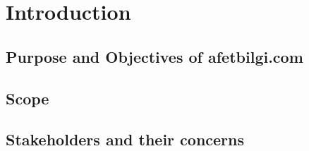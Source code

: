 \chapter{Introduction}

\section{Purpose and Objectives of afetbilgi.com}

\section{Scope}

\section{Stakeholders and their concerns}